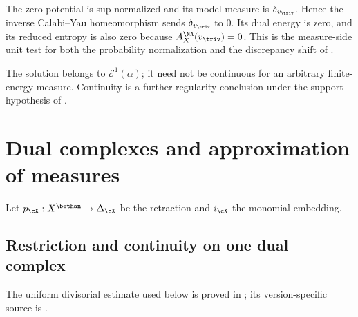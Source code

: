 \begin{example}
\end{example}

\begin{example}
\label{ex:mpwn-trivial-measure}
The zero potential is sup-normalized and its model measure is
$\delta_{v_{\triv}}$.  Hence the inverse Calabi--Yau homeomorphism sends
$\delta_{v_{\triv}}$ to $0$.  Its dual energy is zero, and its reduced
entropy is also zero because $A_X^{\NA}(v_{\triv})=0$.  This is the
measure-side unit test for both the probability normalization and the
discrepancy shift of .
\end{example}

\begin{remark}
\label{rem:mpwn-cy-regularity-scope}
The solution belongs to $\mathcal E^1(\alpha)$; it need not be continuous
for an arbitrary finite-energy measure.  Continuity is a further regularity
conclusion under the support hypothesis of
.
\end{remark}

\section{Dual complexes and approximation of measures}
\label{sec:mpwn-measure-approximation}

Let $p_{\cX}:X^{\bethan}\to\Delta_{\cX}$ be the retraction and
$i_{\cX}$ the monomial embedding.

\subsection{Restriction and continuity on one dual complex}
\label{subsec:mpwn-convex-restriction}

The uniform divisorial estimate used below is proved in
; its version-specific source
is \cite[Theorem~4.3.3, pp.~40--41]{MPTropicalV2}.

